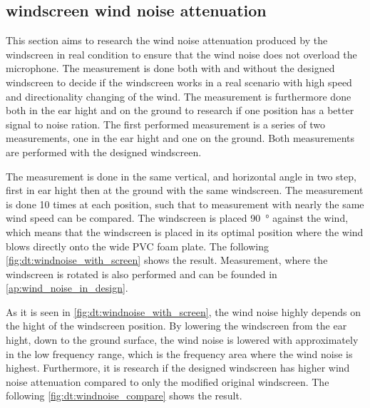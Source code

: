 \subsection{windscreen wind noise attenuation}\label{sec:ds:wind_noi_att}
This section aims to research the wind noise attenuation produced by the windscreen in real condition to ensure that the wind noise does not overload the microphone. The measurement is done both with and without the designed windscreen to decide if the windscreen works in a real scenario with high speed and directionality changing of the wind. The measurement is furthermore done both in the ear hight and on the ground to research if one position has a better signal to noise ration. The first performed measurement is a series of two measurements, one in the ear hight and one on the ground. Both measurements are performed with the designed windscreen. 

The measurement is done in the same vertical, and horizontal angle in two step, first in ear hight then at the ground with the same windscreen. The measurement is done 10 times at each position, such that to measurement with nearly the same wind speed can be compared. The windscreen is placed \SI{90}{\degree} against the wind, which means that the windscreen is placed in its optimal position where the wind blows directly onto the wide PVC foam plate. The following \autoref{fig:dt:windnoise_with_screen} shows the result. Measurement, where the windscreen is rotated is also performed and can be founded in \autoref{ap:wind_noise_in_design}.


As it is seen in \autoref{fig:dt:windnoise_with_screen}, the wind noise highly depends on the hight of the windscreen position. By lowering the windscreen from the ear hight, down to the ground surface, the wind noise is lowered with approximately  in the low frequency range, which is the frequency area where the wind noise is highest. Furthermore, it is research if the designed windscreen has higher wind noise attenuation compared to only the modified original windscreen. The following \autoref{fig:dt:windnoise_compare} shows the result.
 

